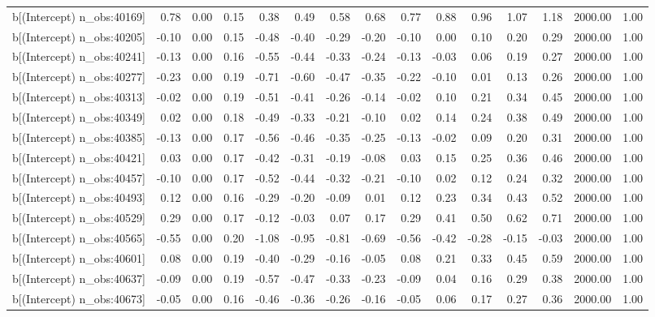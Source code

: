 \begin{table}[ht]
\begin{tabular}{rrrrrrrrrrrrrrr}
  b[(Intercept) n\_obs:40169] & 0.78 & 0.00 & 0.15 & 0.38 & 0.49 & 0.58 & 0.68 & 0.77 & 0.88 & 0.96 & 1.07 & 1.18 & 2000.00 & 1.00 \\ 
  b[(Intercept) n\_obs:40205] & -0.10 & 0.00 & 0.15 & -0.48 & -0.40 & -0.29 & -0.20 & -0.10 & 0.00 & 0.10 & 0.20 & 0.29 & 2000.00 & 1.00 \\ 
  b[(Intercept) n\_obs:40241] & -0.13 & 0.00 & 0.16 & -0.55 & -0.44 & -0.33 & -0.24 & -0.13 & -0.03 & 0.06 & 0.19 & 0.27 & 2000.00 & 1.00 \\ 
  b[(Intercept) n\_obs:40277] & -0.23 & 0.00 & 0.19 & -0.71 & -0.60 & -0.47 & -0.35 & -0.22 & -0.10 & 0.01 & 0.13 & 0.26 & 2000.00 & 1.00 \\ 
  b[(Intercept) n\_obs:40313] & -0.02 & 0.00 & 0.19 & -0.51 & -0.41 & -0.26 & -0.14 & -0.02 & 0.10 & 0.21 & 0.34 & 0.45 & 2000.00 & 1.00 \\ 
  b[(Intercept) n\_obs:40349] & 0.02 & 0.00 & 0.18 & -0.49 & -0.33 & -0.21 & -0.10 & 0.02 & 0.14 & 0.24 & 0.38 & 0.49 & 2000.00 & 1.00 \\ 
  b[(Intercept) n\_obs:40385] & -0.13 & 0.00 & 0.17 & -0.56 & -0.46 & -0.35 & -0.25 & -0.13 & -0.02 & 0.09 & 0.20 & 0.31 & 2000.00 & 1.00 \\ 
  b[(Intercept) n\_obs:40421] & 0.03 & 0.00 & 0.17 & -0.42 & -0.31 & -0.19 & -0.08 & 0.03 & 0.15 & 0.25 & 0.36 & 0.46 & 2000.00 & 1.00 \\ 
  b[(Intercept) n\_obs:40457] & -0.10 & 0.00 & 0.17 & -0.52 & -0.44 & -0.32 & -0.21 & -0.10 & 0.02 & 0.12 & 0.24 & 0.32 & 2000.00 & 1.00 \\ 
  b[(Intercept) n\_obs:40493] & 0.12 & 0.00 & 0.16 & -0.29 & -0.20 & -0.09 & 0.01 & 0.12 & 0.23 & 0.34 & 0.43 & 0.52 & 2000.00 & 1.00 \\ 
  b[(Intercept) n\_obs:40529] & 0.29 & 0.00 & 0.17 & -0.12 & -0.03 & 0.07 & 0.17 & 0.29 & 0.41 & 0.50 & 0.62 & 0.71 & 2000.00 & 1.00 \\ 
  b[(Intercept) n\_obs:40565] & -0.55 & 0.00 & 0.20 & -1.08 & -0.95 & -0.81 & -0.69 & -0.56 & -0.42 & -0.28 & -0.15 & -0.03 & 2000.00 & 1.00 \\ 
  b[(Intercept) n\_obs:40601] & 0.08 & 0.00 & 0.19 & -0.40 & -0.29 & -0.16 & -0.05 & 0.08 & 0.21 & 0.33 & 0.45 & 0.59 & 2000.00 & 1.00 \\ 
  b[(Intercept) n\_obs:40637] & -0.09 & 0.00 & 0.19 & -0.57 & -0.47 & -0.33 & -0.23 & -0.09 & 0.04 & 0.16 & 0.29 & 0.38 & 2000.00 & 1.00 \\ 
  b[(Intercept) n\_obs:40673] & -0.05 & 0.00 & 0.16 & -0.46 & -0.36 & -0.26 & -0.16 & -0.05 & 0.06 & 0.17 & 0.27 & 0.36 & 2000.00 & 1.00 \\ 

\end{tabular}
\end{table}
